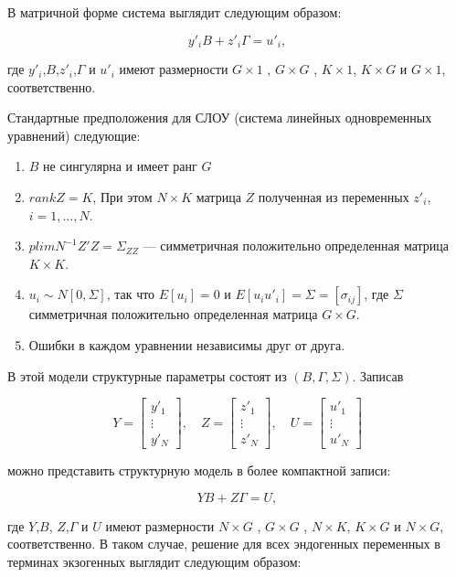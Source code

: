 В матричной форме система выглядит следующим образом:

\begin{equation}
y'_{i}B+z'_{i}\Gamma=u'_{i},
\end{equation}

где $y'_{i}$,$B$,$z'_{i}$,$\Gamma$ и $u'_{i}$ имеют размерности $G \times 1$ , $G \times G$ , $ K \times 1$, $K \times G$ и $G \times 1$, соответственно. 

Стандартные предположения для СЛОУ (система линейных одновременных уравнений) следующие:

\begin{enumerate}
\item $B$ не сингулярна и имеет ранг $G$
\item $rank Z = K$, При этом $N \times K$ матрица $Z$ полученная из переменных $z'_{i}$, $i=1,\dots,N$.
\item $plim N^{-1}Z'Z=\Sigma_{ZZ}$ --- симметричная положительно определенная матрица $K \times K$.
\item $u_{i}\sim N[0,\Sigma]$, так что $E[u_{i}]=0$ и $E[u_{i}u'_{i}]=\Sigma=[\sigma_{ij}]$, где $\Sigma$ симметричная положительно определенная матрица $G \times G$.
\item Ошибки в каждом уравнении независимы друг от друга.
\end{enumerate}


В этой модели структурные параметры состоят из $(B,\Gamma,\Sigma)$. Записав

\[
Y=\begin{bmatrix} y'_{1} \\ \vdots \\ y'_{N} \end{bmatrix}, \quad  Z=\begin{bmatrix} z'_{1} \\ \vdots \\ z'_{N} \end{bmatrix}, \quad U=\begin{bmatrix} u'_{1} \\ \vdots \\ u'_{N} \end{bmatrix}
\]

можно представить структурную модель в более компактной записи:

\begin{equation}
YB+Z\Gamma=U,
\end{equation}

где $Y$,$B$, $Z$,$\Gamma$ и $U$ имеют размерности $N \times G$ , $G \times G$ , $ N \times K$, $K \times G$ и $N \times G$, соответственно. В таком случае, решение для всех эндогенных переменных в терминах экзогенных выглядит следующим образом:


